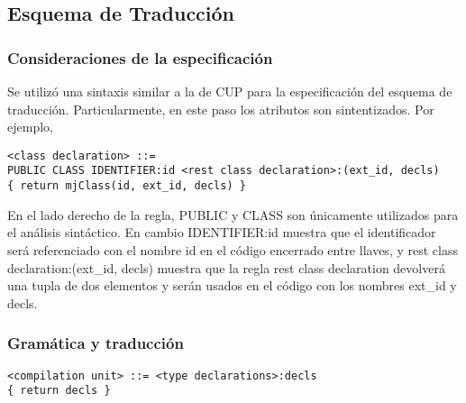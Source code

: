 \documentclass [a4paper,abstracton,titlepage]{scrartcl}
\begin{document}
\subsection{Esquema de Traducción}
  \subsubsection{Consideraciones de la especificación}
Se utilizó una sintaxis similar a la de CUP para la especificación del
esquema de traducción. Particularmente, en este paso los atributos son
sintentizados. Por ejemplo,

\begin{lstlisting}
<class declaration> ::= 
PUBLIC CLASS IDENTIFIER:id <rest class declaration>:(ext_id, decls)
{ return mjClass(id, ext_id, decls) }
\end{lstlisting}

En el lado derecho de la regla, PUBLIC y CLASS son únicamente
utilizados para el análisis sintáctico. En cambio IDENTIFIER:id
muestra que el identificador será referenciado con el nombre id en el
código encerrado entre llaves, y rest class declaration:(ext\_id,
decls) muestra que la regla rest class declaration devolverá
una tupla de dos elementos y serán usados en el código con los nombres
ext\_id y decls.

  \subsubsection{Gramática y traducción}

    \begin{lstlisting}
<compilation unit> ::= <type declarations>:decls
{ return decls }
    \end{lstlisting}
\end{document}
